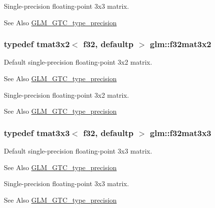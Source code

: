 Single-\/precision floating-\/point 3x3 matrix. \begin{DoxySeeAlso}{See Also}
\hyperlink{group__gtc__type__precision}{G\-L\-M\-\_\-\-G\-T\-C\-\_\-type\-\_\-precision} 
\end{DoxySeeAlso}
\hypertarget{group__gtc__type__precision_ga61653615c76194cdf3454e6e703525e0}{
\subsubsection[{f32mat3x2}]{\setlength{\rightskip}{0pt plus 5cm}typedef tmat3x2$<$ f32, defaultp $>$ {\bf glm\-::f32mat3x2}}}\label{group__gtc__type__precision_ga61653615c76194cdf3454e6e703525e0}
Default single-\/precision floating-\/point 3x2 matrix. \begin{DoxySeeAlso}{See Also}
\hyperlink{group__gtc__type__precision}{G\-L\-M\-\_\-\-G\-T\-C\-\_\-type\-\_\-precision}
\end{DoxySeeAlso}
Single-\/precision floating-\/point 3x2 matrix. \begin{DoxySeeAlso}{See Also}
\hyperlink{group__gtc__type__precision}{G\-L\-M\-\_\-\-G\-T\-C\-\_\-type\-\_\-precision} 
\end{DoxySeeAlso}
\hypertarget{group__gtc__type__precision_ga715b36ea1e2d1ffaaef7517cc78b3877}{
\subsubsection[{f32mat3x3}]{\setlength{\rightskip}{0pt plus 5cm}typedef tmat3x3$<$ f32, defaultp $>$ {\bf glm\-::f32mat3x3}}}\label{group__gtc__type__precision_ga715b36ea1e2d1ffaaef7517cc78b3877}
Default single-\/precision floating-\/point 3x3 matrix. \begin{DoxySeeAlso}{See Also}
\hyperlink{group__gtc__type__precision}{G\-L\-M\-\_\-\-G\-T\-C\-\_\-type\-\_\-precision}
\end{DoxySeeAlso}
Single-\/precision floating-\/point 3x3 matrix. \begin{DoxySeeAlso}{See Also}
\hyperlink{group__gtc__type__precision}{G\-L\-M\-\_\-\-G\-T\-C\-\_\-type\-\_\-precision} 
\end{DoxySeeAlso}
